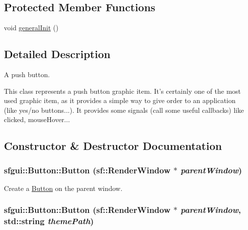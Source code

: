 \subsection*{Protected Member Functions}
\begin{CompactItemize}
\item 
void \hyperlink{classsfgui_1_1Button_59849e58ed4c46061d71f7172cab4e4e}{generalInit} ()
\end{CompactItemize}


\subsection{Detailed Description}
A push button. 

This class represents a push button graphic item. It's certainly one of the most used graphic item, as it provides a simple way to give order to an application (like yes/no buttons...). It provides some signals (call some useful callbacks) like clicked, mouseHover... 

\subsection{Constructor \& Destructor Documentation}
\hypertarget{classsfgui_1_1Button_05c78461b775a073bed1e218586defd7}{
\subsubsection[Button]{\setlength{\rightskip}{0pt plus 5cm}sfgui::Button::Button (sf::RenderWindow $\ast$ {\em parentWindow})}}
\label{classsfgui_1_1Button_05c78461b775a073bed1e218586defd7}




Create a \hyperlink{classsfgui_1_1Button}{Button} on the parent window. \hypertarget{classsfgui_1_1Button_5189b70c8f868718f79c7e119e0b9b32}{
\subsubsection[Button]{\setlength{\rightskip}{0pt plus 5cm}sfgui::Button::Button (sf::RenderWindow $\ast$ {\em parentWindow}, \/  std::string {\em themePath})}}
\label{classsfgui_1_1Button_5189b70c8f868718f79c7e119e0b9b32}




